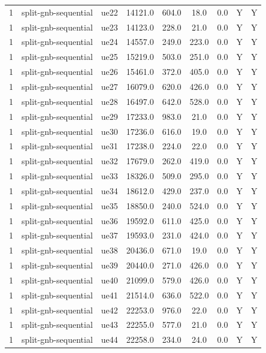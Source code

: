 \begin{table}[ht]
\begin{tabular}{|c|c|c|c|c|c|c|c|c|}
1 & split-gnb-sequential & ue22 & 14121.0 & 604.0 & 18.0 & 0.0 & Y & Y \\
1 & split-gnb-sequential & ue23 & 14123.0 & 228.0 & 21.0 & 0.0 & Y & Y \\
1 & split-gnb-sequential & ue24 & 14557.0 & 249.0 & 223.0 & 0.0 & Y & Y \\
1 & split-gnb-sequential & ue25 & 15219.0 & 503.0 & 251.0 & 0.0 & Y & Y \\
1 & split-gnb-sequential & ue26 & 15461.0 & 372.0 & 405.0 & 0.0 & Y & Y \\
1 & split-gnb-sequential & ue27 & 16079.0 & 620.0 & 426.0 & 0.0 & Y & Y \\
1 & split-gnb-sequential & ue28 & 16497.0 & 642.0 & 528.0 & 0.0 & Y & Y \\
1 & split-gnb-sequential & ue29 & 17233.0 & 983.0 & 21.0 & 0.0 & Y & Y \\
1 & split-gnb-sequential & ue30 & 17236.0 & 616.0 & 19.0 & 0.0 & Y & Y \\
1 & split-gnb-sequential & ue31 & 17238.0 & 224.0 & 22.0 & 0.0 & Y & Y \\
1 & split-gnb-sequential & ue32 & 17679.0 & 262.0 & 419.0 & 0.0 & Y & Y \\
1 & split-gnb-sequential & ue33 & 18326.0 & 509.0 & 295.0 & 0.0 & Y & Y \\
1 & split-gnb-sequential & ue34 & 18612.0 & 429.0 & 237.0 & 0.0 & Y & Y \\
1 & split-gnb-sequential & ue35 & 18850.0 & 240.0 & 524.0 & 0.0 & Y & Y \\
1 & split-gnb-sequential & ue36 & 19592.0 & 611.0 & 425.0 & 0.0 & Y & Y \\
1 & split-gnb-sequential & ue37 & 19593.0 & 231.0 & 424.0 & 0.0 & Y & Y \\
1 & split-gnb-sequential & ue38 & 20436.0 & 671.0 & 19.0 & 0.0 & Y & Y \\
1 & split-gnb-sequential & ue39 & 20440.0 & 271.0 & 426.0 & 0.0 & Y & Y \\
1 & split-gnb-sequential & ue40 & 21099.0 & 579.0 & 426.0 & 0.0 & Y & Y \\
1 & split-gnb-sequential & ue41 & 21514.0 & 636.0 & 522.0 & 0.0 & Y & Y \\
1 & split-gnb-sequential & ue42 & 22253.0 & 976.0 & 22.0 & 0.0 & Y & Y \\
1 & split-gnb-sequential & ue43 & 22255.0 & 577.0 & 21.0 & 0.0 & Y & Y \\
1 & split-gnb-sequential & ue44 & 22258.0 & 234.0 & 24.0 & 0.0 & Y & Y \\

\end{tabular}
\end{table}

